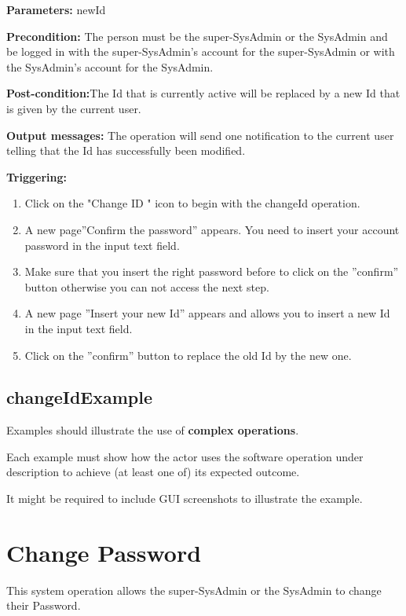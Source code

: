 \begin{description}

\item \textbf{Parameters:} newId
\item \textbf{Precondition:} The person must be the super-SysAdmin or the
SysAdmin and be logged in with the super-SysAdmin's account for the
super-SysAdmin or with the SysAdmin's account for the SysAdmin.
\item \textbf{Post-condition:}The Id that is currently active will be
replaced by a new Id that is given by the current user.
\item \textbf{Output messages:} The operation will send one notification to the
current user telling that the Id  has successfully been modified.


\item \textbf{Triggering:}
\begin{enumerate}
\item Click on the "Change ID " icon to begin with the changeId operation. 
\item A new page''Confirm the password'' appears. You need to insert your
account password in the input text field. 
\item Make sure that you insert the right password before to click on the
''confirm'' button otherwise you can not access the next step.
\item A new page ''Insert your new Id'' appears and allows you to
insert a new Id in the input text field.
\item Click on the ''confirm'' button to replace the old Id by the new one.

\end{enumerate}

 
\end{description}

 
\subsection{changeIdExample}
Examples should illustrate the use of \textbf{complex operations}.

Each example must show how the actor uses the software operation under
description to achieve (at least one of) its expected outcome.

It might be required to include GUI screenshots to illustrate the example.



\section{Change Password}
\label{operation:changePassword}
This system operation allows the super-SysAdmin or the SysAdmin to change
their Password.

